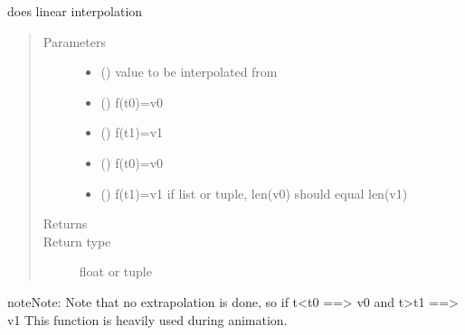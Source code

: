 \documentclass[letterpaper,10pt,english]{sphinxmanual}
\begin{document}
\begin{fulllineitems}
\label{\detokenize{Reference:salabim.interpolate}}
does linear interpolation
\begin{quote}\begin{description}
\item[{Parameters}] \leavevmode\begin{itemize}
\item {} 
 () \textendash{} value to be interpolated from

\item {} 
 () \textendash{} f(t0)=v0

\item {} 
 () \textendash{} f(t1)=v1

\item {} 
 (\sphinxstyleliteralemphasis{, }) \textendash{} f(t0)=v0

\item {} 
 (\sphinxstyleliteralemphasis{, }) \textendash{} f(t1)=v1 
if list or tuple, len(v0) should equal len(v1)

\end{itemize}

\item[{Returns}] \leavevmode
{}

\item[{Return type}] \leavevmode
float or tuple

\end{description}\end{quote}

\begin{sphinxadmonition}{note}{Note:}
Note that no extrapolation is done, so if t\textless{}t0 ==\textgreater{} v0  and t\textgreater{}t1 ==\textgreater{} v1 
This function is heavily used during animation.
\end{sphinxadmonition}

\end{fulllineitems}
\end{document}
